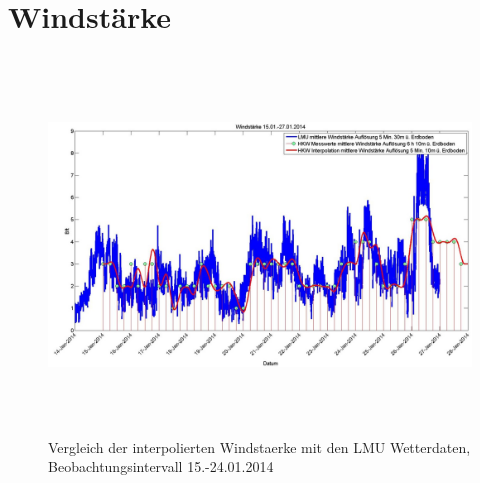 \section{Windstärke}
\begin{figure}[htbp]
\centering
\includegraphics[width=16cm,height=10cm]{analyse/windstaerke2}
\caption{Vergleich der interpolierten Windstaerke mit den LMU Wetterdaten, Beobachtungsintervall 15.-24.01.2014}
\label{fig:windstaerke}
\end{figure}
